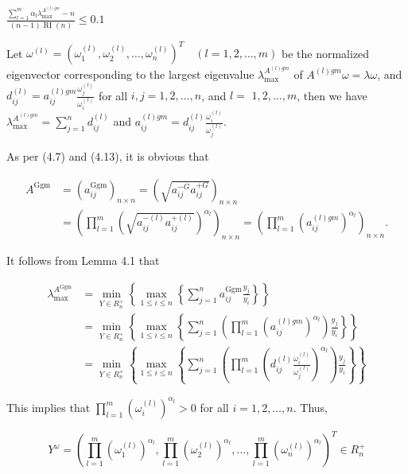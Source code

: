 \documentclass[10pt]{article}
\begin{document}
$\frac{\sum_{l=1}^{m} \alpha_{l} \lambda_{\max }^{A^{(l) g m}}-n}{(n-1) \operatorname{RI}(n)} \leq 0.1$

Let $\omega^{(l)}=\left(\omega_{1}^{(l)}, \omega_{2}^{(l)}, \ldots, \omega_{n}^{(l)}\right)^{T} \quad(l=1,2, \ldots, m)$ be the normalized eigenvector corresponding to the largest eigenvalue $\lambda_{\max }^{A^{(l) g m}}$ of $A^{(l) g m} \omega=\lambda \omega$, and $d_{i j}^{(l)}=a_{i j}^{(l) g m} \frac{\omega_{j}^{(l)}}{\omega_{i}^{(l)}}$ for all $i, j=1,2, \ldots, n$, and $l=$ $1,2, \ldots, m$, then we have $\lambda_{\max }^{A^{(l) g m}}=\sum_{j=1}^{n} d_{i j}^{(l)}$ and $a_{i j}^{(l) g m}=d_{i j}^{(l)} \frac{\omega_{i}^{(l)}}{\omega_{j}^{(l)}}$.

As per (4.7) and (4.13), it is obvious that

$$
\begin{aligned}
A^{\mathrm{Ggm}} & =\left(a_{i j}^{\mathrm{Ggm}}\right)_{n \times n}=\left(\sqrt{a_{i j}^{-G} a_{i j}^{+G}}\right)_{n \times n} \\
& =\left(\prod_{l=1}^{m}\left(\sqrt{a_{i j}^{-(l)} a_{i j}^{+(l)}}\right)^{\alpha_{l}}\right)_{n \times n}=\left(\prod_{l=1}^{m}\left(a_{i j}^{(l) g m}\right)^{\alpha_{l}}\right)_{n \times n} .
\end{aligned}
$$

It follows from Lemma 4.1 that

$$
\begin{aligned}
\lambda_{\max }^{A^{\mathrm{Ggm}}} & =\min _{Y \in R_{n}^{+}}\left\{\max _{1 \leq i \leq n}\left\{\sum_{j=1}^{n} a_{i j}^{\mathrm{Ggm}} \frac{y_{j}}{y_{i}}\right\}\right\} \\
& =\min _{Y \in R_{n}^{+}}\left\{\max _{1 \leq i \leq n}\left\{\sum_{j=1}^{n}\left(\prod_{l=1}^{m}\left(a_{i j}^{(l) g m}\right)^{\alpha_{l}}\right) \frac{y_{j}}{y_{i}}\right\}\right\} \\
& =\min _{Y \in R_{n}^{+}}\left\{\max _{1 \leq i \leq n}\left\{\sum_{j=1}^{n}\left(\prod_{l=1}^{m}\left(d_{i j}^{(l)} \frac{\omega_{i}^{(l)}}{\omega_{j}^{(l)}}\right)^{\alpha_{l}}\right) \frac{y_{j}}{y_{i}}\right\}\right\}
\end{aligned}
$$

This implies that $\prod_{l=1}^{m}\left(\omega_{i}^{(l)}\right)^{\alpha_{l}}>0$ for all $i=1,2, \ldots, n$. Thus,

$$
Y^{\omega}=\left(\prod_{l=1}^{m}\left(\omega_{1}^{(l)}\right)^{\alpha_{l}}, \prod_{l=1}^{m}\left(\omega_{2}^{(l)}\right)^{\alpha_{l}}, \ldots, \prod_{l=1}^{m}\left(\omega_{n}^{(l)}\right)^{\alpha_{l}}\right)^{T} \in R_{n}^{+}
$$
\end{document}
